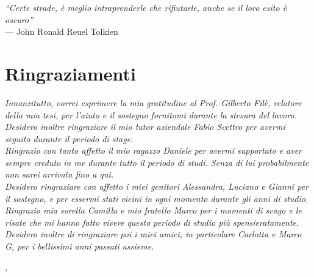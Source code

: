 
\cleardoublepage
{}
{}

\begin{flushright}{
	\slshape    
	``Certe strade, è meglio intraprenderle che rifiutarle, anche se il loro esito è oscuro''} \\ 
	\medskip
    --- John Ronald Reuel Tolkien
\end{flushright}


\bigskip

\begingroup
\let\clearpage\relax
\let\cleardoublepage\relax
\let\cleardoublepage\relax

\chapter*{Ringraziamenti}

\noindent \textit{Innanzitutto, vorrei esprimere la mia gratitudine al Prof. Gilberto Filè, relatore della mia tesi, per l'aiuto e il sostegno fornitomi durante la stesura del lavoro.}\\

\noindent \textit{Desidero inoltre ringraziare il mio tutor aziendale Fabio Scettro per avermi seguito durante il periodo di stage.}\\

\noindent \textit{Ringrazio con tanto affetto il mio ragazzo Daniele per avermi supportato e aver sempre creduto in me durante tutto il periodo di studi. Senza di lui probabilmente non sarei arrivata fino a qui.}\\

\noindent \textit{Desidero ringraziare con affetto i miei genitori Alessandra, Luciano e Gianni per il sostegno, e per essermi stati vicini in ogni momento durante gli anni di studio.}\\

\noindent \textit{Ringrazio mia sorella Camilla e mio fratello Marco per i momenti di svago e le risate che mi hanno fatto vivere questo periodo di studio più spensieratamente.}\\

\noindent \textit{Desidero inoltre di ringraziare poi i miei amici, in particolare Carlotta e Marco G, per i bellissimi anni passati assieme.}\\
\bigskip

\noindent\textit{\myLocation, \myTime}
\hfill \myName

\endgroup

